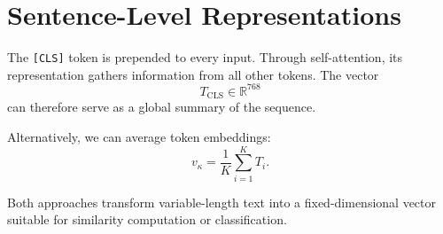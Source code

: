 \section{Sentence-Level Representations}
\medskip

The \texttt{[CLS]} token is prepended to every input. Through self-attention, its representation gathers information from all other tokens. The vector
\[
T_{\text{CLS}} \in \mathbb{R}^{768}
\]
can therefore serve as a global summary of the sequence.

Alternatively, we can average token embeddings:
\[
v_\kappa
=
\frac{1}{K}
\sum_{i=1}^{K} T_i.
\]

Both approaches transform variable-length text into a fixed-dimensional vector suitable for similarity computation or classification.

\bigskip

